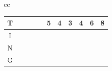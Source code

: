 \begin{table}
\begin{center}
\begin{tabular}[c]{cc}
{\begin{tabular}[c]{c|c|c|c|c|c|c|c|c|c|c|}
				T &                       &                       &                      &                       & \cellcolor{green!25}5 & \cellcolor{green!25}4 & \cellcolor{blue!75}3 & \cellcolor{green!25}4 & \cellcolor{green!25}6 & \cellcolor{green!25}8 \\\hline
				I &                       &                       &                      &                       & \cellcolor{green!25}  & \cellcolor{green!25}  & \cellcolor{green!25} & \cellcolor{green!25}  & \cellcolor{green!25}  & \cellcolor{green!25}  \\\hline
				N &                       &                       &                      &                       & \cellcolor{green!25}  & \cellcolor{green!25}  & \cellcolor{green!25} & \cellcolor{green!25}  & \cellcolor{green!25}  & \cellcolor{green!25}  \\\hline
				G &                       &                       &                      &                       & \cellcolor{green!25}  & \cellcolor{green!25}  & \cellcolor{green!25} & \cellcolor{green!25}  & \cellcolor{green!25}  & \cellcolor{blue!25}   \\\hline
			\end{tabular}
        } \\
        \addlinespace[1cm]
\end{tabular}
\end{center}
\end{table}
